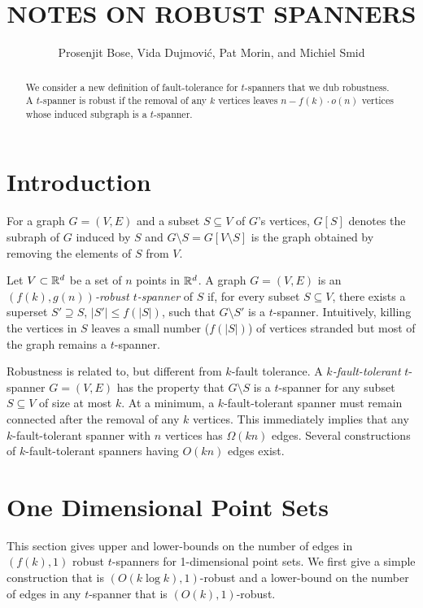 \documentclass{patmorin}
\title{\MakeUppercase{Notes on Robust Spanners}}
\author{Prosenjit Bose, Vida Dujmovi\'c, Pat Morin, and Michiel Smid}
\begin{document}
\maketitle

\begin{abstract}
We consider a new definition of fault-tolerance for $t$-spanners that
we dub robustness.  A $t$-spanner is robust if the removal of any $k$
vertices leaves $n-f(k)\cdot o(n)$ vertices whose induced subgraph is
a $t$-spanner.
\end{abstract}

\section{Introduction}

For a graph $G=(V,E)$ and a subset $S\subseteq V$ of $G$'s vertices,
$G[S]$ denotes the subraph of $G$ induced by $S$ and $G\setminus
S=G[V\setminus S]$ is the graph obtained by removing the elements of $S$
from $V$.

Let $V\subset \mathbb{R}^d$ be a set of $n$ points in $\mathbb{R}^d$.  A graph $G=(V,E)$
is an \emph{$(f(k),g(n))$-robust $t$-spanner} of $S$ if, for every subset
$S\subseteq V$, there exists a superset $S'\supseteq S$, $|S'|\le f(|S|)$,
such that $G\setminus S'$ is a $t$-spanner.  Intuitively, killing the
vertices in $S$ leaves a small number ($f(|S|)$) of vertices stranded
but most of the graph remains a $t$-spanner.

Robustness is related to, but different from $k$-fault tolerance.
A \emph{$k$-fault-tolerant} $t$-spanner $G=(V,E)$ has the property that
$G\setminus S$ is a $t$-spanner for any subset $S\subseteq V$ of size
at most $k$.  At a minimum, a $k$-fault-tolerant spanner must remain
connected after the removal of any $k$ vertices.  This immediately implies
that any $k$-fault-tolerant spanner with $n$ vertices has $\Omega(kn)$
edges.  Several constructions of $k$-fault-tolerant spanners having
$O(kn)$ edges exist.

\section{One Dimensional Point Sets}

This section gives upper and lower-bounds on the number of edges
in $(f(k),1)$ robust $t$-spanners for 1-dimensional point sets.
We first give a simple construction that is $(O(k\log k),1)$-robust
and a lower-bound on the number of edges in any $t$-spanner that is
$(O(k),1)$-robust.
\end{document}
